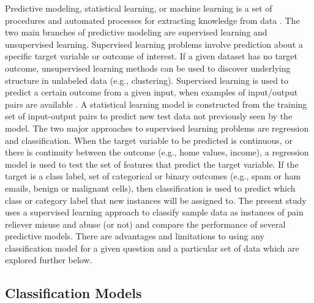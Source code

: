 \documentclass[sigconf]{acmart}
\begin{document}
Predictive modeling, statistical learning, or machine learning is a set 
of procedures and automated processes for extracting knowledge from data 
\cite{james13, kuhn13, muller17, raschka17}. The two main branches of 
predictive modeling are supervised learning and unsupervised learning. 
Supervised learning problems involve prediction about a specific target 
variable or outcome of interest. If a given dataset has no target outcome, 
unsupervised learning methods can be used to discover underlying structure 
in unlabeled data (e.g., clustering). Supervised learning is used to predict 
a certain outcome from a given input, when examples of input/output pairs are 
available \cite{muller17}. A statistical learning model is constructed from the 
training set of input-output pairs to predict new test data not previously seen 
by the model. The two major approaches to supervised learning problems are 
regression and classification. When the target variable to be predicted is 
continuous, or there is continuity between the outcome (e.g., home values, 
income), a regression model is used to test the set of features that predict 
the target variable. If the target is a class label, set of categorical or 
binary outcomes (e.g., spam or ham emails, benign or malignant cells), then 
classification is used to predict which class or category label that new 
instances will be assigned to. The present study uses a supervised learning 
approach to classify sample data as instances of pain reliever misuse and abuse 
(or not) and compare the performance of several predictive models. There are
advantages and limitations to using any classification model for a given 
question and a particular set of data which are explored further below. 

\subsection{Classification Models} 
\end{document}
